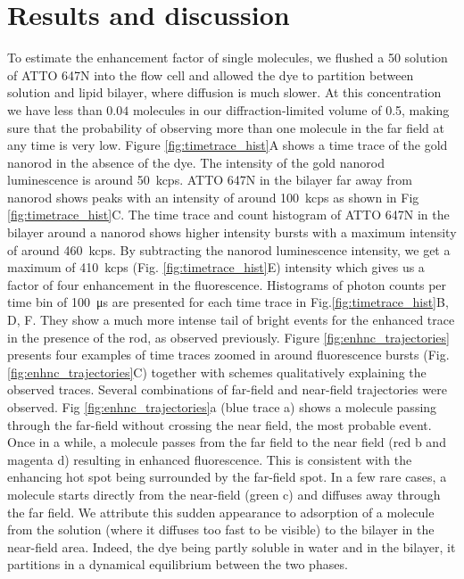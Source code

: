 \section{Results and discussion}
To estimate the enhancement factor of single molecules, we flushed a \SI{50}{\pM} solution of ATTO 647N into the flow cell and allowed the dye to partition between solution and lipid bilayer, where diffusion is much slower.
At this concentration we have less than $0.04$ molecules in our diffraction-limited volume of \SI{0.5}{\fL}, making sure that the probability of observing more than one molecule in the far field at any time is very low.
Figure \ref{fig:timetrace_hist}A shows a time trace of the gold nanorod in the absence of the dye.
The intensity of the gold nanorod luminescence is around \SI{50}{kcps}.
ATTO 647N in the bilayer far away from nanorod shows peaks with an intensity of around \SI{100}{kcps} as shown in Fig \ref{fig:timetrace_hist}C.
The time trace and count histogram of ATTO 647N in the bilayer around a nanorod shows higher intensity bursts with a maximum intensity of around \SI{460}{kcps}. 
By subtracting the nanorod luminescence intensity, we get a maximum of \SI{410}{kcps} (Fig. \ref{fig:timetrace_hist}E) intensity which gives us a factor of four enhancement in the fluorescence. Histograms of photon counts per time bin of \SI{100}{\us} are presented for each time trace in Fig.\ref{fig:timetrace_hist}B, D, F. 
They show a much more intense tail of bright events for the enhanced trace in the presence of the rod, as observed previously.\cite{khatua2014resonant}
Figure \ref{fig:enhnc_trajectories} presents four examples of time traces zoomed in around fluorescence bursts (Fig. \ref{fig:enhnc_trajectories}C) together with schemes qualitatively explaining the observed traces.
Several combinations of far-field and near-field trajectories were observed.
Fig \ref{fig:enhnc_trajectories}a (blue trace a) shows a molecule passing through the far-field without crossing the near field, the most probable event.
Once in a while, a molecule passes from the far field to the near field (red b and magenta d) resulting in enhanced fluorescence.
This is consistent with the enhancing hot spot being surrounded by the far-field spot.
In a few rare cases, a molecule starts directly from the near-field (green c) and diffuses away through the far field.
We attribute this sudden appearance to adsorption of a molecule from the solution (where it diffuses too fast to be visible) to the bilayer in the near-field area.
Indeed, the dye being partly soluble in water and in the bilayer, it partitions in a dynamical equilibrium between the two phases.
